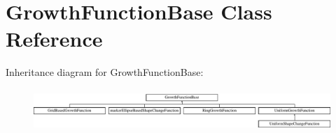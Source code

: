 \hypertarget{classGrowthFunctionBase}{}\section{Growth\+Function\+Base Class Reference}
\label{classGrowthFunctionBase}
Inheritance diagram for Growth\+Function\+Base\+:\begin{figure}[H]
\begin{center}
\leavevmode
\includegraphics[height=1.615385cm]{classGrowthFunctionBase}
\end{center}
\end{figure}
